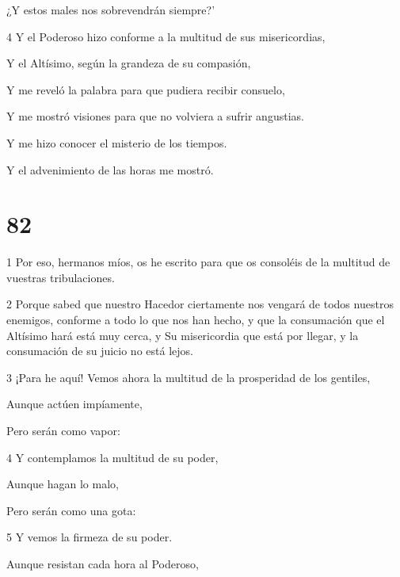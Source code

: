 \par ¿Y estos males nos sobrevendrán siempre?'

\par 4 Y el Poderoso hizo conforme a la multitud de sus misericordias,

\par Y el Altísimo, según la grandeza de su compasión,

\par Y me reveló la palabra para que pudiera recibir consuelo,

\par Y me mostró visiones para que no volviera a sufrir angustias.

\par Y me hizo conocer el misterio de los tiempos.

\par Y el advenimiento de las horas me mostró.

\chapter{82}

\par 1 Por eso, hermanos míos, os he escrito para que os consoléis de la multitud de vuestras tribulaciones.

\par 2 Porque sabed que nuestro Hacedor ciertamente nos vengará de todos nuestros enemigos, conforme a todo lo que nos han hecho, y que la consumación que el Altísimo hará está muy cerca, y Su misericordia que está por llegar, y la consumación de su juicio no está lejos.

\par 3 ¡Para he aquí! Vemos ahora la multitud de la prosperidad de los gentiles,

\par Aunque actúen impíamente,

\par Pero serán como vapor:

\par 4 Y contemplamos la multitud de su poder,

\par Aunque hagan lo malo,

\par Pero serán como una gota:

\par 5 Y vemos la firmeza de su poder.

\par Aunque resistan cada hora al Poderoso,

